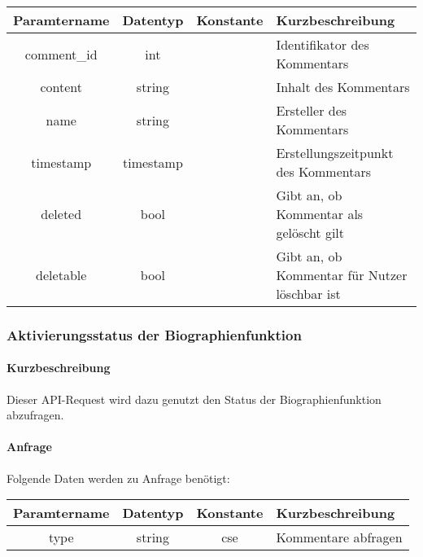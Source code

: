\begin{table}[H]
	\begin{tabular}{|c|c|c|p{6.5cm}|}
		\hline
		\textbf{Paramtername} & \textbf{Datentyp} & \textbf{Konstante} & \textbf{Kurzbeschreibung}    \\ \hline
		comment\_id            & int             &                 & Identifikator des Kommentars \\ \hline
		content                & string          &                 & Inhalt des Kommentars \\ \hline
		name                   & string          &                 & Ersteller des Kommentars \\ \hline
		timestamp              & timestamp       &                 & Erstellungszeitpunkt des Kommentars \\ \hline
		deleted                & bool            &                 & Gibt an, ob Kommentar als gelöscht gilt \\ \hline
		deletable              & bool            &                 & Gibt an, ob Kommentar für Nutzer löschbar ist \\ \hline
	\end{tabular}
\end{table}

\subsubsection{Aktivierungsstatus der Biographienfunktion}
\paragraph{Kurzbeschreibung}Dieser API-Request wird dazu genutzt den Status der Biographienfunktion abzufragen.
\paragraph{Anfrage}Folgende Daten werden zu Anfrage benötigt:
\begin{table}[H]
	\begin{tabular}{|c|c|c|p{6.5cm}|}
		\hline
		\textbf{Paramtername} & \textbf{Datentyp} & \textbf{Konstante} & \textbf{Kurzbeschreibung}                                                                                               \\ \hline
		type                & string            & cse                & Kommentare abfragen \\ \hline
	\end{tabular}
\end{table}
